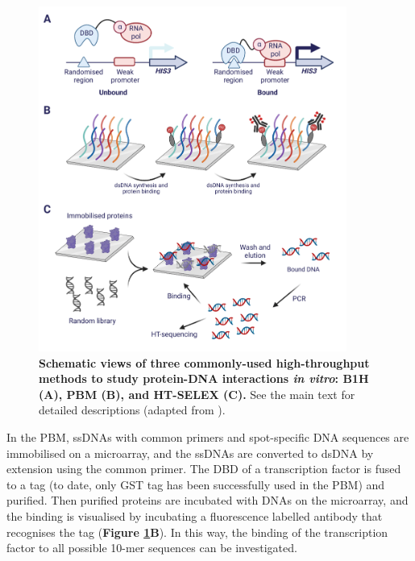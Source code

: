\begin{figure}[h]
    \centering
    \includegraphics[width=0.9\textwidth]{chapter1/figures/fig7.pdf}
    \caption[Schematic views of three commonly-used high-throughput methods to study protein-DNA interactions \textit{in vitro}]{\textbf{Schematic views of three commonly-used high-throughput methods to study protein-DNA interactions \textit{in vitro}: B1H (A), PBM (B), and HT-SELEX (C).} See the main text for detailed descriptions (adapted from \cite{stormo2010determining}).}
    \label{fig:fig7}
\end{figure}

In the PBM, ssDNAs with common primers and spot-specific DNA sequences are immobilised on a microarray, and the ssDNAs are converted to dsDNA by extension using the common primer. The DBD of a transcription factor is fused to a tag (to date, only GST tag has been successfully used in the PBM) and purified. Then purified proteins are incubated with DNAs on the microarray, and the binding is visualised by incubating a fluorescence labelled antibody that recognises the tag (\textbf{Figure \ref{fig:fig7}B}). In this way, the binding of the transcription factor to all possible 10-mer sequences can be investigated.

